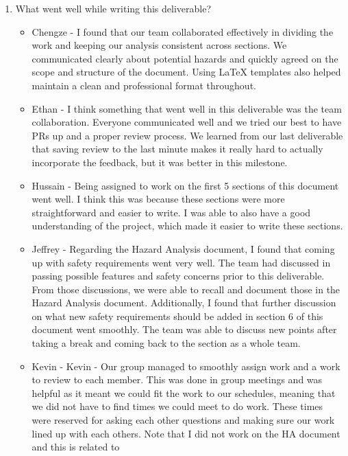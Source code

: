 \documentclass{article}
\begin{document}
\begin{enumerate}
    \item What went well while writing this deliverable? 
    \begin{itemize}
        \item Chengze - I found that our team collaborated effectively in dividing the work 
        and keeping our analysis consistent across sections. We communicated clearly about 
        potential hazards and quickly agreed on the scope and structure of the document. 
        Using LaTeX templates also helped maintain a clean and professional format throughout.
        \item Ethan - I think something that went well in this deliverable was
          the team collaboration. Everyone communicated well and we tried our
          best to have PRs up and a proper review process. We learned from our
          last deliverable that saving review to the last minute makes it
          really hard to actually incorporate the feedback, but it was better
          in this milestone.
        \item Hussain - Being assigned to work on the first 5 sections of this document
        went well. I think this was because these sections were more straightforward
        and easier to write. I was able to also have a good understanding of the
        project, which made it easier to write these sections.
        \item Jeffrey - Regarding the Hazard Analysis document, I found that
        coming up with safety requirements went very well. The team had discussed
        in passing possible features and safety concerns prior to this deliverable.
        From those discussions, we were able to recall and document those in the
        Hazard Analysis document. Additionally, I found that further discussion on
        what new safety requirements should be added in section 6 of this document
        went smoothly. The team was able to discuss new points after taking a break
        and coming back to the section as a whole team.
        \item Kevin - Kevin - Our group managed to smoothly assign work and a work 
        to review to each member. This was done in group meetings and was helpful 
        as it meant we could fit the work to our schedules, meaning that we did not 
        have to find times we could meet to do work. These times were reserved for 
        asking each other questions and making sure our work lined up with each 
        others. Note that I did not work on the HA document and this is related to 

\end{itemize}
\end{enumerate}
\end{document}
